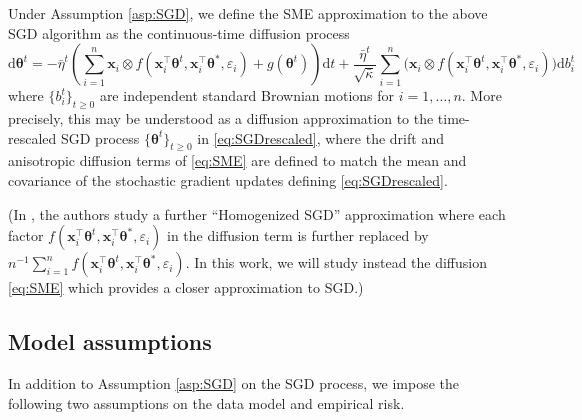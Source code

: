 \documentclass[11pt,letterpaper,reqno]{amsart}
\theoremstyle{definition}
\def\eps{\varepsilon}
\def\d{\mathrm{d}}
\def\x{\mathbf{x}}
\def\btheta{\boldsymbol{\theta}}
\begin{document}
Under Assumption \ref{asp:SGD}, we define the SME approximation
\cite{li2017stochastic} to the above SGD algorithm as the continuous-time
diffusion process
\begin{equation}\label{eq:SME}
\d\btheta^t={-}\bar\eta^t\left(\sum_{i=1}^n \x_i \otimes
f(\x_i^\top \btheta^t,\x_i^\top \btheta^*,\eps_i)
+g(\btheta^t)\right)\d t
+\frac{\bar\eta^t}{\sqrt{\bar \kappa}} \sum_{i=1}^n \Big(\x_i \otimes
f(\x_i^\top \btheta^t,\x_i^\top \btheta^*,\eps_i)\Big) \d b_i^t
\end{equation}
where $\{b_i^t\}_{t \geq 0}$ are independent standard Brownian motions for
$i=1,\ldots,n$. More precisely, this may be understood as a diffusion
approximation to the time-rescaled SGD process $\{\btheta^t\}_{t \geq 0}$ in
\eqref{eq:SGDrescaled}, where the drift
and anisotropic diffusion terms of \eqref{eq:SME} are defined to match the mean and
covariance of the stochastic gradient updates defining \eqref{eq:SGDrescaled}.

(In \cite{paquette2025homogenization}, the authors study a further ``Homogenized
SGD'' approximation where each factor 
$f(\x_i^\top \btheta^t,\x_i^\top \btheta^*,\eps_i)$ in the diffusion term is
further replaced by
$n^{-1}\sum_{i=1}^n f(\x_i^\top \btheta^t,\x_i^\top \btheta^*,\eps_i)$. In this
work, we will study instead the diffusion \eqref{eq:SME} which provides a closer
approximation to SGD.)

\subsection{Model assumptions}

In addition to Assumption \ref{asp:SGD} on the SGD process, we impose the
following two assumptions on the data model and empirical risk.
\end{document}
